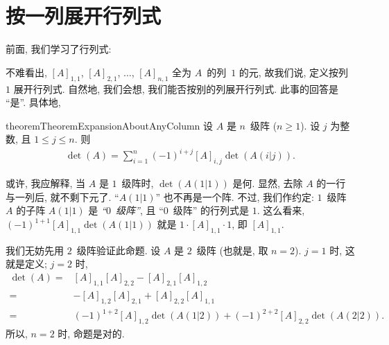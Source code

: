 \documentclass[../libro.tex]{subfiles}
\begin{document}
\section{按一列展开行列式}

前面, 我们学习了行列式:

\DefinitionDeterminants*

不难看出,
\([A]_{1,1}\), \([A]_{2,1}\), \(\dots\), \([A]_{n,1}\)
全为 \(A\)~的列~\(1\) 的元,
故我们说,
定义按列~\(1\) 展开行列式.
自然地, 我们会想,
我们能否按别的列展开行列式.
此事的回答是 ``是''.
具体地,

\begin{restatable}{theorem}{TheoremExpansionAboutAnyColumn}
    设 \(A\) 是 \(n\)~级阵 (\(n \geq 1\)).
    设 \(j\) 为整数, 且 \(1 \leq j \leq n\).
    则
    \begin{align*}
        \det {(A)}
        = \sum_{i = 1}^{n} {(-1)^{i+j} [A]_{i,j} \det {(A(i|j))}}.
    \end{align*}
\end{restatable}


或许, 我应解释,
当 \(A\) 是 \(1\)~级阵时,
\(\det {(A(1|1))}\) 是何.
显然, 去除 \(A\) 的一行与一列后,
就不剩下元了.
``\(A(1|1)\)'' 也不再是一个阵.
不过, 我们作约定:
\(1\)~级阵 \(A\) 的子阵 \(A(1|1)\) 是 \emph{``\(0\)~级阵''},
且 ``\(0\)~级阵'' 的行列式是 \(1\).
这么看来, \((-1)^{1+1} [A]_{1,1} \det {(A(1|1))}\)
就是 \(1 \cdot [A]_{1,1} \cdot 1\),
即 \([A]_{1,1}\).

我们无妨先用 \(2\)~级阵验证此命题.
设 \(A\) 是 \(2\)~级阵 (也就是, 取 \(n = 2\)).
\(j = 1\) 时, 这就是定义;
\(j = 2\) 时,
\begin{align*}
    \det {(A)}
    = {} &
    [A]_{1,1} [A]_{2,2} - [A]_{2,1} [A]_{1,2}
    \\
    = {} &
    {-} [A]_{1,2} [A]_{2,1} + [A]_{2,2} [A]_{1,1}
    \\
    = {} &
    (-1)^{1+2} [A]_{1,2} \det {(A(1|2))}
    + (-1)^{2+2} [A]_{2,2} \det {(A(2|2))}.
\end{align*}
所以, \(n = 2\) 时, 命题是对的.
\end{document}
